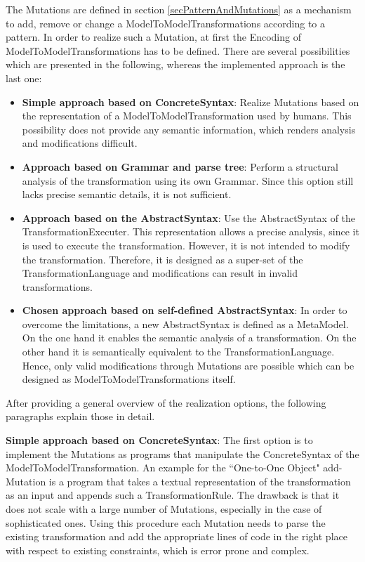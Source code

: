 The \glspl{Mutation} are defined in section \ref{secPatternAndMutations} as a mechanism to add, remove or change a \glspl{ModelToModelTransformation} according to a pattern. In order to realize such a \gls{Mutation}, at first the \gls{Encoding} of \glspl{ModelToModelTransformation} has to be defined. There are several possibilities which are presented in the following, whereas the implemented approach is the last one:

\begin{itemize}
	\item \textbf{Simple approach based on \gls{ConcreteSyntax}}: Realize \glspl{Mutation} based on the representation of a \gls{ModelToModelTransformation} used by humans. This possibility does not provide any semantic information, which renders analysis and modifications difficult. 
	\item \textbf{Approach based on \gls{Grammar} and parse tree}: Perform a structural analysis of the transformation using its own \gls{Grammar}. Since this option still lacks precise semantic details, it is not sufficient. 
	\item \textbf{Approach based on the \gls{AbstractSyntax}}: Use the \gls{AbstractSyntax} of the \gls{TransformationExecuter}. This representation allows a precise analysis, since it is used to execute the transformation. However, it is not intended to modify the transformation. Therefore, it is designed as a super-set of the \gls{TransformationLanguage} and modifications can result in invalid transformations.
	\item \textbf{Chosen approach based on self-defined \gls{AbstractSyntax}}: In order to overcome the limitations, a new \gls{AbstractSyntax} is defined as a \gls{MetaModel}. On the one hand it enables the semantic analysis of a transformation. On the other hand it is semantically equivalent to the \gls{TransformationLanguage}. Hence, only valid modifications through \glspl{Mutation} are possible which can be designed as \glspl{ModelToModelTransformation} itself.
\end{itemize}

After providing a general overview of the realization options, the following paragraphs explain those in detail.

\textbf{Simple approach based on \gls{ConcreteSyntax}}: The first option is to implement the \glspl{Mutation} as programs that manipulate the \gls{ConcreteSyntax} of the \gls{ModelToModelTransformation}. An example for the ``One-to-One Object" add-\gls{Mutation} is a program that takes a textual representation of the transformation as an input and appends such a \gls{TransformationRule}. The drawback is that it does not scale with a large number of \glspl{Mutation}, especially in the case of sophisticated ones. Using this procedure each \gls{Mutation} needs to parse the existing transformation and add the appropriate lines of code in the right place with respect to existing constraints, which is error prone and complex.

